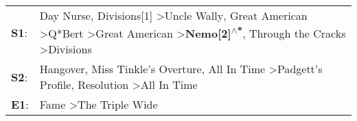 \begin{supertabular}{p{0.03\textwidth}p{0.92\textwidth}}
 \textbf{S1}:  &  Day Nurse\textsuperscript{}, \enspace Divisions[1]\textsuperscript{} \textgreater \enspace Uncle Wally\textsuperscript{}, \enspace Great American\textsuperscript{} \textgreater \enspace Q*Bert\textsuperscript{} \textgreater \enspace Great American\textsuperscript{} \textgreater \enspace \textbf{Nemo[2]\textsuperscript{$\wedge$*}}, \enspace Through the Cracks\textsuperscript{} \textgreater \enspace Divisions\textsuperscript{}  \enspace  \\
 \textbf{S2}:  &                                                                                                                                                                    Hangover\textsuperscript{}, \enspace Miss Tinkle's Overture\textsuperscript{}, \enspace All In Time\textsuperscript{} \textgreater \enspace Padgett's Profile\textsuperscript{}, \enspace Resolution\textsuperscript{} \textgreater \enspace All In Time\textsuperscript{}  \enspace  \\
 \textbf{E1}:  &                                                                                                                                                                                                                                                                                                                                                                Fame\textsuperscript{} \textgreater \enspace The Triple Wide\textsuperscript{}  \enspace  \\
\end{supertabular}
